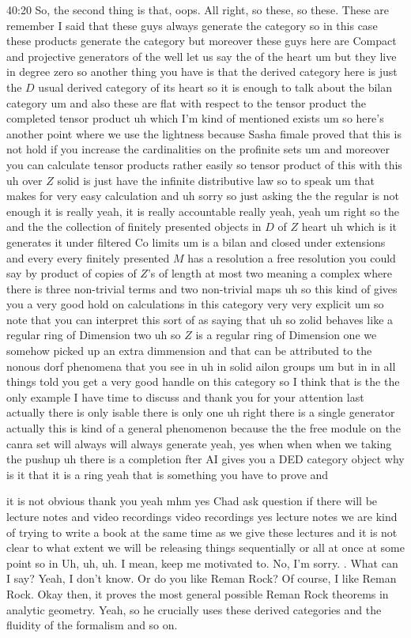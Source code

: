 \begin{unfinished}{40:20}
So, the second thing is that, oops. All right, so these, so these. These are remember I said that these guys always generate the category so in this case these products generate the category but moreover these guys here are Compact and projective generators of the well let us say the of the heart um but they live in degree zero so another thing you have is that the derived category here is just the $D$ usual derived category of its heart so it is enough to talk about the bilan category um and also these are flat with respect to the tensor product the completed tensor product uh which I'm kind of mentioned exists um so here's another point where we use the lightness because Sasha fimale proved that this is not hold if you increase the cardinalities on the profinite sets um and moreover you can calculate tensor products rather easily so tensor product of this with this uh over $Z$ solid is just have the infinite distributive law so to speak um that makes for very easy calculation and uh sorry so just asking the the regular is not enough it is really yeah, it is really accountable really yeah, yeah um right so the and the the collection of finitely presented objects in $D$ of $Z$ heart uh which is it generates it under filtered Co limits um is a bilan and closed under extensions and every every finitely presented $M$ has a resolution a free resolution you could say by product of copies of $Z$'s of length at most two meaning a complex where there is three non-trivial terms and two non-trivial maps uh so this kind of gives you a very good hold on calculations in this category very very explicit um so note that you can interpret this sort of as saying that uh so zolid behaves like a regular ring of Dimension two uh so $Z$ is a regular ring of Dimension one we somehow picked up an extra dimmension and that can be attributed to the nonous dorf phenomena that you see in uh in solid ailon groups um but in in all things told you get a very good handle on this category so I think that is the the only example I have time to discuss and thank you for your attention last actually there is only isable there is only one uh right there is a single generator actually this is kind of a general phenomenon because the the free module on the canra set will always will always generate yeah, yes when when when we taking the pushup uh there is a completion fter AI gives you a DED category object why is it that it is a ring yeah that is something you have to prove and

 it is not obvious thank you yeah mhm yes Chad ask question if there will be lecture notes and video recordings video recordings yes lecture notes we are kind of trying to write a book at the same time as we give these lectures and it is not clear to what extent we will be releasing things sequentially or all at once at some point so in
 Uh, uh, uh. I mean, keep me motivated to. No, I'm sorry. . What can I say? Yeah, I don't know. Or do you like Reman Rock? Of course, I like Reman Rock. Okay then, it proves the most general possible Reman Rock theorems in analytic geometry. Yeah, so he crucially uses these derived categories and the fluidity of the formalism and so on.


\end{unfinished}
